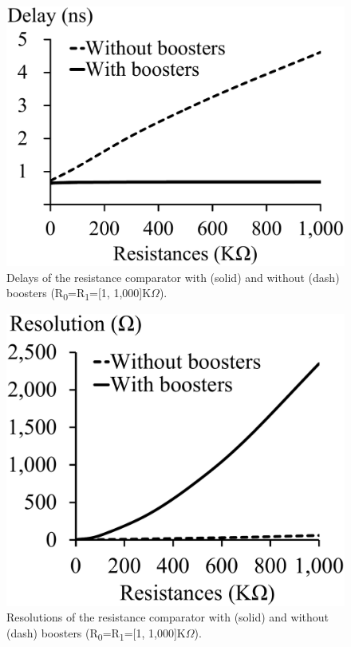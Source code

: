 \documentclass[twocolumn,conference]{IEEEtran}
\begin{document}
\begin{figure}[ht]
    \centering
    \includegraphics[scale=0.2]{figs/ComparatorDelayVsResistance}
    \caption{Delays of the resistance comparator with (solid) and without (dash) boosters (R\textsubscript{0}=R\textsubscript{1}=[1, 1,000]K$\Omega$).}
    \label{fig:ComparatorDelayVsResistance}
\end{figure}
\begin{figure}[ht]
    \centering
    \includegraphics[scale=0.2]{figs/ComparatorResolution}
    \caption{Resolutions of the resistance comparator with (solid) and without (dash) boosters (R\textsubscript{0}=R\textsubscript{1}=[1, 1,000]K$\Omega$).}
    \label{fig:ComparatorResolution}
\end{figure}
\end{document}
